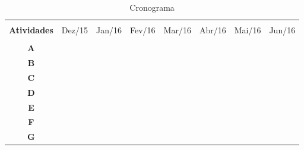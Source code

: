 \begin{table}[!htb]
  \centering
  \caption{Cronograma}\label{tb:cronograma}
  \begin{tabular}{cp{1.3cm}p{1.3cm}p{1.3cm}p{1.3cm}p{1.3cm}p{1.3cm}p{1.3cm}}
    \hline \hline &\\[-0.4cm]
    \textbf{Atividades} & Dez/15 & Jan/16 &  Fev/16 & Mar/16 & Abr/16 &  Mai/16 & Jun/16 \\
    \hline &\\[-0.4cm]
    \textbf{A} & \cellcolor{black!50} &   &   &   &   &   &   \\[0.2cm]
    \textbf{B} & \cellcolor{black!50} & \cellcolor{black!50} &   &   &   &   &   \\[0.2cm]
    \textbf{C} &   &   & \cellcolor{black!25} &   &   &   &   \\[0.2cm]
    \textbf{D} &   &   & \cellcolor{black!25} & \cellcolor{black!25} &   &   &   \\[0.2cm]
    \textbf{E} &   &   &   &   & \cellcolor{black!25} &   &   \\[0.2cm]
    \textbf{F} &   &   &   &   & \cellcolor{black!25} & \cellcolor{black!25} &   \\[0.2cm]
    \textbf{G} &   &   &   &   &   &   & \cellcolor{black!25} \\[0.2cm]
    \hline \hline
  \end{tabular}
\end{table}
